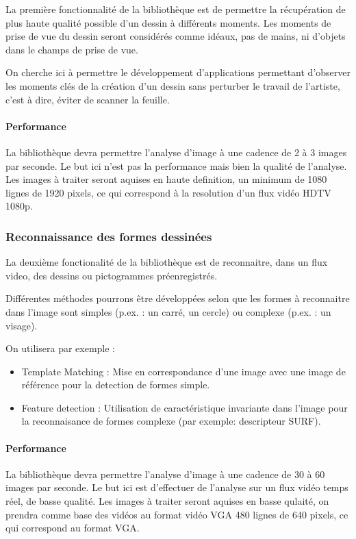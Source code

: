 La première fonctionnalité de la bibliothèque est de permettre la récupération de plus haute qualité possible d’un dessin à différents moments. Les moments de prise de vue du dessin seront considérés comme idéaux, pas de mains, ni d'objets dans le champs de prise de vue.

On cherche ici à permettre le développement d'applications permettant d'observer les moments clés de la création d'un dessin sans perturber le travail de l'artiste, c'est à dire, éviter de scanner la feuille.

\paragraph{Performance\protect\footnotemark[1]\\}
La bibliothèque devra permettre l'analyse d'image à une cadence de 2 à 3 images par seconde. Le but ici n'est pas la performance mais bien la qualité de l'analyse.
Les images à traiter seront aquises en haute definition, un minimum de 1080 lignes de 1920 pixels, ce qui correspond à la resolution d'un flux vidéo HDTV 1080p.


\subsubsection{Reconnaissance des formes dessinées}
La deuxième fonctionalité de la bibliothèque est de reconnaitre, dans un flux video, des dessins ou pictogrammes préenregistrés. 

Différentes méthodes pourrons être développées selon que les formes à reconnaitre dans l'image sont simples (p.ex. : un carré, un cercle) ou complexe (p.ex. : un visage).

On utilisera par exemple :

\begin{itemize}
\item Template Matching : Mise en correspondance d'une image avec une image de référence pour la detection de formes simple.
\item Feature detection : Utilisation de caractéristique invariante dans l'image pour la reconnaisance de formes complexe (par exemple: descripteur SURF).
\end{itemize}

\paragraph{Performance\protect\footnotemark[1]\\}
La bibliothèque devra permettre l'analyse d'image à une cadence de 30 à 60 images par seconde. Le but ici est d'effectuer de l'analyse sur un flux vidéo temps réel, de basse qualité.
Les images à traiter seront aquises en basse qulaité, on prendra comme base des vidéos au format vidéo VGA 480 lignes de 640 pixels, ce qui correspond au format VGA.

